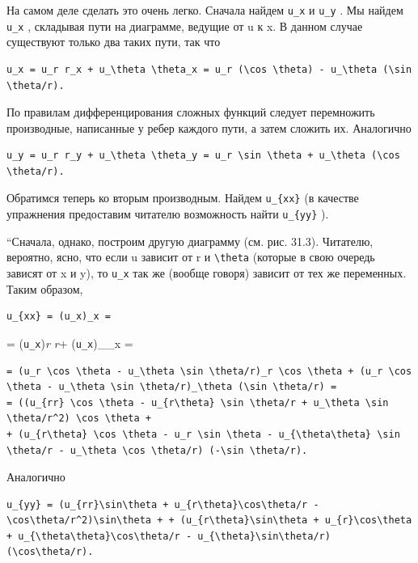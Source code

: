 \documentclass[
  ukrainian,
]{article}
\begin{document}
На самом деле сделать это очень легко. Сначала найдем \texttt{u\_x} и
\texttt{u\_y} . Мы найдем \texttt{u\_x} , складывая пути на диаграмме,
ведущие от u к x. В данном случае существуют только два таких пути, так
что

\begin{verbatim}
u_x = u_r r_x + u_\theta \theta_x = u_r (\cos \theta) - u_\theta (\sin \theta/r).
\end{verbatim}

По правилам дифференцирования сложных функций следует перемножить
производные, написанные у ребер каждого пути, а затем сложить их.
Аналогично

\begin{verbatim}
u_y = u_r r_y + u_\theta \theta_y = u_r \sin \theta + u_\theta (\cos \theta/r).
\end{verbatim}

Обратимся теперь ко вторым производным. Найдем \texttt{u\_\{xx\}} (в
качестве упражнения предоставим читателю возможность найти
\texttt{u\_\{yy\}} ).

``Сначала, однако, построим другую диаграмму (см. рис. 31.3). Читателю,
вероятно, ясно, что если u зависит от r и \texttt{\textbackslash{}theta}
(которые в свою очередь зависят от x и y), то \texttt{u\_x} так же
(вообще говоря) зависит от тех же переменных. Таким образом,

\begin{verbatim}
u_{xx} = (u_x)_x =
\end{verbatim}

= (\texttt{u\_x})\emph{r r} + (\texttt{u\_x})\_\theta \theta\_x =

\begin{verbatim}
= (u_r \cos \theta - u_\theta \sin \theta/r)_r \cos \theta + (u_r \cos \theta - u_\theta \sin \theta/r)_\theta (\sin \theta/r) =
= ((u_{rr} \cos \theta - u_{r\theta} \sin \theta/r + u_\theta \sin \theta/r^2) \cos \theta +
+ (u_{r\theta} \cos \theta - u_r \sin \theta - u_{\theta\theta} \sin \theta/r - u_\theta \cos \theta/r) (-\sin \theta/r).
\end{verbatim}

Аналогично

\begin{verbatim}
u_{yy} = (u_{rr}\sin\theta + u_{r\theta}\cos\theta/r - \cos\theta/r^2)\sin\theta + + (u_{r\theta}\sin\theta + u_{r}\cos\theta + u_{\theta\theta}\cos\theta/r - u_{\theta}\sin\theta/r)(\cos\theta/r).
\end{verbatim}
\end{document}
